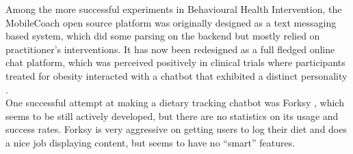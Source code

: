 Among the more successful experiments in Behavioural Health Intervention, the MobileCoach open source platform \cite{mobilecoacheu} was originally designed as a text messaging based system, which did some parsing on the backend but mostly relied on practitioner's interventions. It has now been redesigned as a full fledged online chat platform, which was perceived positively in clinical trials where participants treated for obesity interacted with a chatbot that exhibited a distinct personality \cite{Kowatsch2017}. \\
One successful attempt at making a dietary tracking chatbot was Forksy \cite{forksywebsite}, which seems to be still actively developed, but there are no statistics on its usage and success rates. Forksy is very aggressive on getting users to log their diet and does a nice job displaying content, but seems to have no ``smart'' features.
